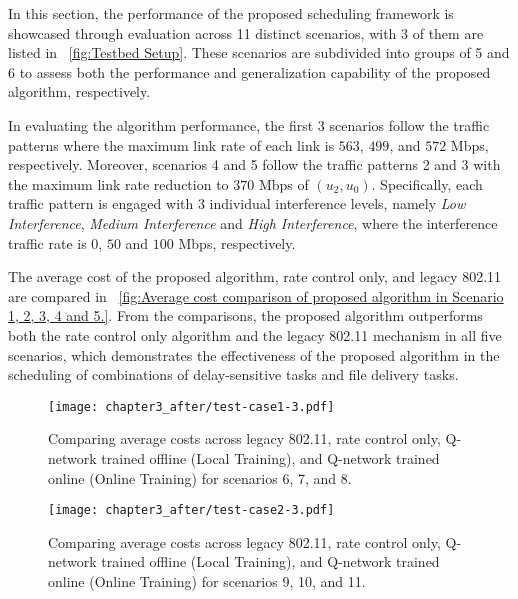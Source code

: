 In this section, the performance of the proposed scheduling framework is showcased through evaluation across 11 distinct scenarios, with $3$ of them are listed in \figurename~\ref{fig:Testbed Setup}. These scenarios are subdivided into groups of 5 and 6 to assess both the performance and generalization capability of the proposed algorithm, respectively.

In evaluating the algorithm performance, the first $3$ scenarios follow the traffic patterns where the maximum link rate of each link is $563$, $499$, and $572$ Mbps, respectively. 
Moreover, scenarios 4 and 5 follow the traffic patterns 2 and 3 with the maximum link rate reduction to $370$ Mbps of $(u_2, u_0)$.
Specifically, each traffic pattern is engaged with $3$ individual interference levels, namely \textit{Low Interference}, \textit{Medium Interference} and \textit{High Interference}, where the interference traffic rate is $0$, $50$ and $100$ Mbps, respectively. 

The average cost of the proposed algorithm, rate control only, and legacy 802.11 are compared in \figurename~\ref{fig:Average cost comparison of proposed algorithm in Scenario 1, 2, 3, 4 and 5.}. From the comparisons, the proposed algorithm outperforms both the rate control only algorithm and the legacy 802.11 mechanism in all five scenarios, which demonstrates the effectiveness of the proposed algorithm in the scheduling of combinations of delay-sensitive tasks and file delivery tasks.

\begin{figure}[!t]
    \centering
    \texttt{[image: chapter3\_after/test-case1-3.pdf]} %
    \caption{Comparing average costs across legacy 802.11, rate control only, Q-network trained offline (Local Training), and Q-network trained online (Online Training) for scenarios 6, 7, and 8.\label{fig:Test-changing interference-cost for test scenario 6, 7 and 8.}}
\end{figure}

\begin{figure}[!t]
    \centering
    \texttt{[image: chapter3\_after/test-case2-3.pdf]} %
    \caption{Comparing average costs across legacy 802.11, rate control only, Q-network trained offline (Local Training), and Q-network trained online (Online Training) for scenarios 9, 10, and 11.\label{fig:Test-changing interference-cost for test scenario 9, 10 and 11.}}
\end{figure}

